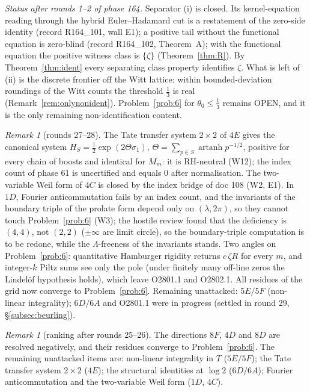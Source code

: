 \documentclass[11pt]{amsart}
\theoremstyle{definition}
\theoremstyle{remark}
\newtheorem{remark}[theorem]{Remark}
\begin{document}
\noindent\emph{Status after rounds 1--2 of phase 164.} Separator (i) is closed. Its kernel-equation reading through the hybrid
Euler--Hadamard cut is a restatement of the zero-side identity (record R164\_101, wall E1); a positive tail without the functional
equation is zero-blind (record R164\_102, Theorem~A); with the functional equation the positive witness class is $\{\zeta\}$
(Theorem~\ref{thm:R}). By Theorem~\ref{thm:ident} every separating class property identifies $\zeta$. What is left of (ii) is
the discrete frontier off the Witt lattice: within bounded-deviation roundings of the Witt counts the threshold $\frac13$ is real
(Remark~\ref{rem:onlynonident}). Problem~\ref{prob:6} for $\theta_0\le\frac13$ remains OPEN, and it is the only remaining
non-identification content.

\begin{remark}[rounds 27--28]\label{rem:r2728}
The Tate transfer system $2\times2$ of $4E$ gives the canonical system $H_S=\frac12\exp(2\Theta\sigma_1)$,
$\Theta=\sum_{p\in S}\operatorname{artanh}p^{-1/2}$, positive for every chain of boosts and identical for $M_m$: it is
RH-neutral (W12); the index count of phase 61 is uncertified and equals $0$ after normalisation. The
two-variable Weil form of $4C$ is closed by the index bridge of doc 108 (W2, E1). In $1D$, Fourier
anticommutation fails by an index count, and the invariants of the boundary triple of the prolate form depend
only on $(\lambda,2\pi)$, so they cannot touch Problem~\ref{prob:6} (W3); the hostile review found that the
deficiency is $(4,4)$, not $(2,2)$ ($\pm\infty$ are limit circle), so the boundary-triple computation is to be
redone, while the $\Lambda$-freeness of the invariants stands. Two angles on Problem~\ref{prob:6}: quantitative
Hamburger rigidity returns $c\,\zeta R$ for every $m$, and integer-$k$ Piltz sums see only the pole (under finitely
many off-line zeros the Lindel\"of hypothesis holds), which leave O2801.1 and O2802.1. All residues of the grid now
converge to Problem~\ref{prob:6}. Remaining unattacked: $5E/5F$ (non-linear integrality); $6D/6A$ and O2801.1 were
in progress (settled in round 29, \S\ref{subsec:beurling}).
\end{remark}

\begin{remark}[ranking after rounds 25--26]
The directions $8F$, $4D$ and $8D$ are resolved negatively, and their residues converge to Problem~\ref{prob:6}.
The remaining unattacked items are: non-linear integrality in $T$ ($5E/5F$); the Tate transfer system $2\times2$ ($4E$);
the structural identities at $\log2$ ($6D/6A$); Fourier anticommutation and the two-variable Weil form ($1D$, $4C$).
\end{remark}
\end{document}
